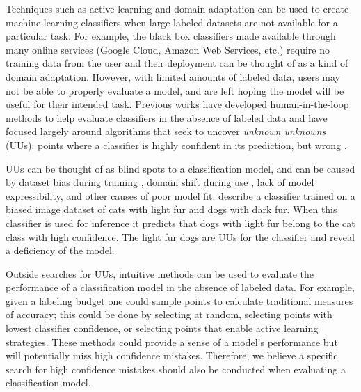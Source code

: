 \documentclass[letterpaper]{article} %
\newcommand{\km}[1]{{\color{red} #1}} %
\begin{document}
Techniques such as active learning \citep{Settles2010} and domain adaptation \citep{Patel2014} can be used to create machine learning classifiers when large labeled datasets are not available for a particular task. For example, the black box classifiers made available through many online services (Google Cloud, Amazon Web Services, etc.) require no training data from the user and their deployment can be thought of as a kind of domain adaptation.  However, with limited amounts of labeled data, users may not be able to properly evaluate a model, and are left hoping the model will be useful for their intended task. Previous works have developed human-in-the-loop methods to help evaluate classifiers in the absence of labeled data and have focused largely around algorithms that seek to uncover \textit{unknown unknowns} (UUs): points where a classifier is highly confident in its prediction, but wrong \citep{Attenberg2015}. 

UUs can be thought of as blind spots to a classification model, and can be caused by dataset bias during training \citep{stock2017convnets}, domain shift during use \citep{sugiyama2017dataset}, lack of model expressibility, and other causes of poor model fit. \citet{Lakkaraju2016} describe a classifier trained on a biased image dataset of cats with light fur and dogs with dark fur. When this classifier is used for inference it predicts that dogs with light fur belong to the cat class with high confidence.  The light fur dogs are UUs for the classifier and reveal a deficiency of the model.  


Outside searches for UUs, intuitive methods can be used to evaluate the performance of a classification model in the absence of labeled data. \km{ For example, given a labeling budget one could sample points to calculate traditional measures of accuracy; this could be done by selecting at random, selecting points with lowest classifier confidence, or selecting points that enable active learning strategies.}  These methods could provide a sense of a model's performance but will potentially miss high confidence mistakes. Therefore, we believe a specific search for high confidence mistakes should also be conducted when evaluating a classification model.
\end{document}
